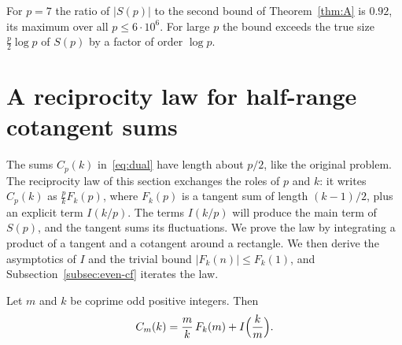 \begin{remark}\label{rem:thmA-sharpness}
For $p=7$ the ratio of $|S(p)|$ to the second bound of Theorem~\ref{thm:A} is $0.92$, its maximum over all $p\le6\cdot10^6$. For large $p$ the bound exceeds the true size $\frac p2\log p$ of $S(p)$ by a factor of order $\log p$.
\end{remark}

\section{A reciprocity law for half-range cotangent sums}\label{sec:reciprocity}

The sums $C_p(k)$ in~\eqref{eq:dual} have length about $p/2$, like the original problem. The reciprocity law of this section exchanges the roles of $p$ and $k$: it writes $C_p(k)$ as $\frac pkF_k(p)$, where $F_k(p)$ is a tangent sum of length $(k-1)/2$, plus an explicit term $I(k/p)$. The terms $I(k/p)$ will produce the main term of $S(p)$, and the tangent sums its fluctuations. We prove the law by integrating a product of a tangent and a cotangent around a rectangle. We then derive the asymptotics of $I$ and the trivial bound $|F_k(n)|\le F_k(1)$, and Subsection~\ref{subsec:even-cf} iterates the law.

\begin{lemma}[Reciprocity]\label{lem:reciprocity}
Let $m$ and $k$ be coprime odd positive integers. Then
\[
C_m(k)=\frac mk\,F_k(m)+I\Bigl(\frac km\Bigr).
\]
\end{lemma}

